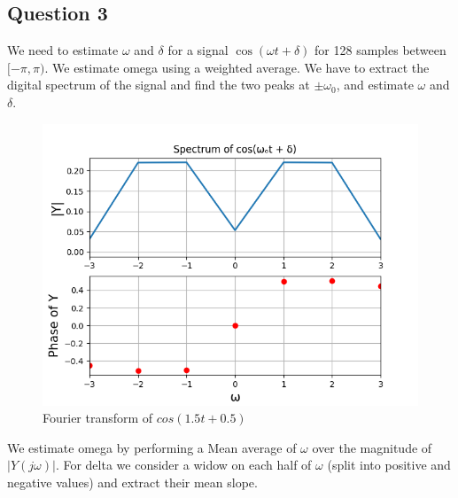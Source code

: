 \documentclass[11pt, a4paper]{article}
\begin{document}
\subsection{Question 3}
We need to estimate $\omega$ and $\delta$ for a signal $\cos(\omega t + \delta)$ for 128 samples between $[-\pi,\pi)$. We estimate omega using a weighted average. We have to extract the digital spectrum of the signal and find the two peaks at $\pm\omega_0$, and estimate $\omega$ and $\delta$.
\begin{figure}[h!]
\centering
\includegraphics[scale=0.6]{10-8.png}
\caption{Fourier transform of $cos(1.5t+0.5)$}
\label{fig:universe}
\end{figure}

We estimate omega by performing a Mean average of $\omega$ over the magnitude of $|Y(j\omega)|$.
For delta we consider a widow on each half of $\omega$ (split into positive and negative values) and extract their mean slope. 

\newpage
\end{document}
